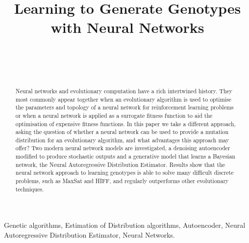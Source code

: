 \documentclass[twoside]{article}
\begin{document}
\title{\bf Learning to Generate Genotypes with Neural Networks}  

\author{ \hfill {}\\ 
\AND
        \hfill {}\\
\AND
        \hfill {}\\
}

\maketitle

\begin{abstract}

Neural networks and evolutionary computation have a rich intertwined history. They most commonly appear together when an evolutionary algorithm is used to optimise the parameters and topology of a neural network for reinforcement learning problems or when a neural network is applied as a surrogate fitness function to aid the optimisation of expensive fitness functions. In this paper we take a different approach, asking the question of whether a neural network can be used to provide a mutation distribution for an evolutionary algorithm, and what advantages this approach may offer? Two modern neural network models are investigated, a denoising autoencoder modified to produce stochastic outputs and a generative model that learns a Bayesian network, the Neural Autoregressive Distribution Estimator. Results show that the neural network approach to learning genotypes is able to solve many difficult discrete problems, such as MaxSat and HIFF, and regularly outperforms other evolutionary techniques.

\end{abstract}

\begin{keywords}

Genetic algorithms, 
Estimation of Distribution algorithms,
Autoencoder,
Neural Autoregressive Distribution Estimator,
Neural Networks.

\end{keywords}
\end{document}

